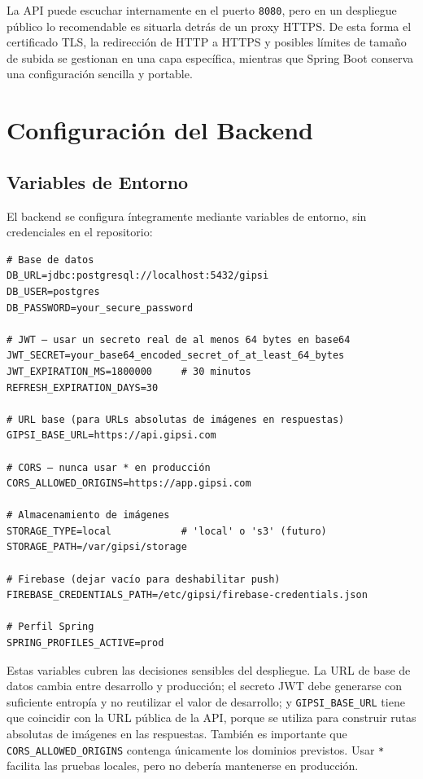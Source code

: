 \documentclass[12pt,a4paper,twoside]{report}
\begin{document}
La API puede escuchar internamente en el puerto \texttt{8080}, pero en un
despliegue público lo recomendable es situarla detrás de un proxy HTTPS. De
esta forma el certificado TLS, la redirección de HTTP a HTTPS y posibles
límites de tamaño de subida se gestionan en una capa específica, mientras que
Spring Boot conserva una configuración sencilla y portable.

\section{Configuración del Backend}

\subsection{Variables de Entorno}

El backend se configura íntegramente mediante variables de entorno, sin credenciales en el repositorio:

\begin{lstlisting}[style=yamlStyle, caption={Variables de entorno del backend}, label={lst:env-backend}]
# Base de datos
DB_URL=jdbc:postgresql://localhost:5432/gipsi
DB_USER=postgres
DB_PASSWORD=your_secure_password

# JWT — usar un secreto real de al menos 64 bytes en base64
JWT_SECRET=your_base64_encoded_secret_of_at_least_64_bytes
JWT_EXPIRATION_MS=1800000     # 30 minutos
REFRESH_EXPIRATION_DAYS=30

# URL base (para URLs absolutas de imágenes en respuestas)
GIPSI_BASE_URL=https://api.gipsi.com

# CORS — nunca usar * en producción
CORS_ALLOWED_ORIGINS=https://app.gipsi.com

# Almacenamiento de imágenes
STORAGE_TYPE=local            # 'local' o 's3' (futuro)
STORAGE_PATH=/var/gipsi/storage

# Firebase (dejar vacío para deshabilitar push)
FIREBASE_CREDENTIALS_PATH=/etc/gipsi/firebase-credentials.json

# Perfil Spring
SPRING_PROFILES_ACTIVE=prod
\end{lstlisting}

Estas variables cubren las decisiones sensibles del despliegue. La URL de base
de datos cambia entre desarrollo y producción; el secreto JWT debe generarse
con suficiente entropía y no reutilizar el valor de desarrollo; y
\texttt{GIPSI\_BASE\_URL} tiene que coincidir con la URL pública de la API,
porque se utiliza para construir rutas absolutas de imágenes en las respuestas.
También es importante que \texttt{CORS\_ALLOWED\_ORIGINS} contenga únicamente
los dominios previstos. Usar \texttt{*} facilita las pruebas locales, pero no
debería mantenerse en producción.
\end{document}
